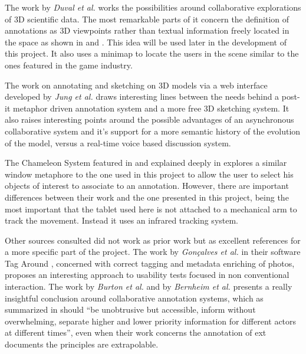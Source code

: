 The work by {\em Duval et al.} \cite{Duval} works the possibilities around collaborative explorations of 3D scientific data. The most remarkable parts of it concern the definition of annotations as 3D viewpoints rather than textual information freely located in the space as shown in \cite{Kadobayashi} and \cite{Sonnet}. This idea will be used later in the development of this project. It also uses a minimap to locate the users in the scene similar to the ones featured in the game industry.

The work on annotating and sketching on 3D models via a web interface developed by {\em Jung et al.} \cite{Jung} draws interesting lines between the needs behind a post-it metaphor driven annotation system and a more free 3D sketching system. It also raises interesting points around the possible advantages of an asynchronous collaborative system and it's support for a more semantic history of the evolution of the model, versus a real-time voice based discussion system.

The Chameleon System featured in \cite{3DUI} and explained deeply in \cite{Tsang} explores a similar window metaphore to the one used in this project to allow the user to select his objects of interest to associate to an annotation. However, there are important differences between their work and the one presented in this project, being the most important that the tablet used here is not attached to a mechanical arm to track the movement. Instead it uses an infrared tracking system.

Other sources consulted did not work as prior work but as excellent references for a more specific part of the project. The work by {\em Gonçalves et al.} in their software Tag Around \cite{Goncalves}, concerned with correct tagging and metadata enriching of photos, proposes an interesting approach to usability tests focused in non conventional interaction. The work by {\em Burton et al.}\cite{Burton} and by {\em Bernheim et al.}\cite{Bernheim} presents a really insightful conclusion around collaborative annotation systems, which as summarized in \cite{Jung} should ``be unobtrusive but accessible, inform without overwhelming, separate higher and lower priority information for different actors at different times'', even when their work concerns the annotation of ext documents the principles are extrapolable.
